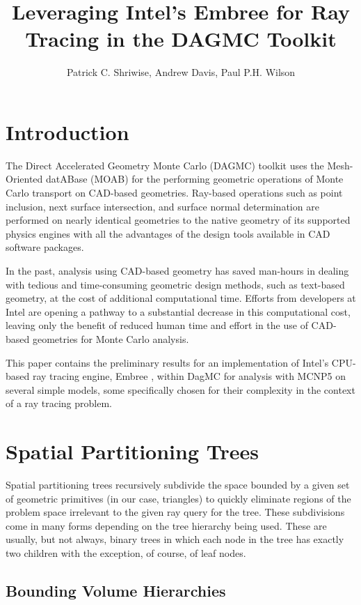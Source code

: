 \documentclass{anstrans}
\title{Leveraging Intel's Embree for Ray Tracing in the DAGMC Toolkit}
\author{Patrick C. Shriwise, Andrew Davis, Paul P.H. Wilson}
\institute{Department of Nuclear Engineering $\&$ Engineering Physics, University of Wisconsin-Madison, 1500 Engineering Dr, Madison, WI 53706, shriwise@wisc.edu}
\begin{document}
\section{Introduction}

The Direct Accelerated Geometry Monte Carlo (DAGMC) \cite{dagmc_2009} toolkit uses the Mesh-Oriented datABase (MOAB) \cite{moab} for the performing geometric operations of Monte Carlo transport on CAD-based geometries. Ray-based operations such as point inclusion, next surface intersection, and surface normal determination are performed on nearly identical geometries to the native geometry of its supported physics engines with all the advantages of the design tools available in CAD software packages.

In the past, analysis using CAD-based geometry has saved man-hours in dealing with tedious and time-consuming geometric design methods, such as text-based geometry, at the cost of additional computational time. Efforts from developers at Intel are opening a pathway to a substantial decrease in this computational cost, leaving only the benefit of reduced human time and effort in the use of CAD-based geometries for Monte Carlo analysis. 

This paper contains the preliminary results for an implementation of Intel's CPU-based ray tracing engine, Embree \cite{embree}, within DagMC for analysis with MCNP5 \cite{mcnp5} on several simple models, some specifically chosen for their complexity in the context of a ray tracing problem.

\section{Spatial Partitioning Trees}

Spatial partitioning trees recursively subdivide the space bounded by a given set of geometric primitives (in our case, triangles) to quickly eliminate regions of the problem space irrelevant to the given ray query for the tree. These subdivisions come in many forms depending on the tree hierarchy being used. These are usually, but not always, binary trees in which each node in the tree has exactly two children with the exception, of course, of leaf nodes.

\subsection{Bounding Volume Hierarchies}
\end{document}
